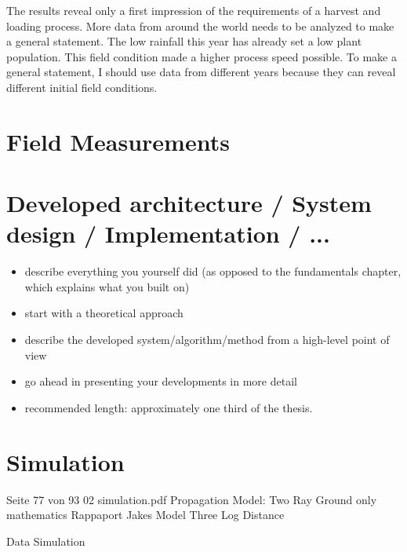 \documentclass[]{nsm-thesis}
\begin{document}
The results reveal only a first impression of the requirements of a harvest and loading process. More data from around the world needs to be analyzed to make a general statement. The low rainfall this year has already set a low plant population. This field condition made a higher process speed possible. To make a general statement, I should use data from different years because they can reveal different initial field conditions.





\chapter{Field Measurements}


\chapter{Developed architecture / System design / Implementation / ...}


\begin{itemize}
\item describe everything you yourself did (as opposed to the fundamentals chapter, which explains what you built on)
\item start with a theoretical approach
\item describe the developed system/algorithm/method from a high-level point of view
\item go ahead in presenting your developments in more detail
\item recommended length: approximately one third of the thesis.
\end{itemize}

\chapter{Simulation}
Seite 77 von 93 02 simulation.pdf
Propagation Model:
 Two Ray Ground only mathematics Rappaport
 Jakes Model
 Three Log Distance
 
 
 Data Simulation
 
 
 

 
\end{document}
